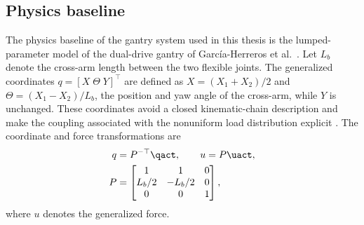 \subsection{Physics baseline}\label{sec:baseline}
The physics baseline of the gantry system used in this thesis
is the lumped-parameter model of the
dual-drive gantry of Garc\'ia-Herreros et al.~\cite{garcia2013model}.
Let \(L_b\) denote the cross-arm length between the two flexible joints.
The generalized coordinates  $q=[X\;\Theta\;Y]^\top$ are defined as $X=(X_1+X_2)/2$ and $\Theta=(X_1-X_2)/L_b$, the position and yaw angle of the cross-arm, while $Y$ is
unchanged. These coordinates avoid
a closed kinematic-chain description and make the coupling 
associated with the
nonuniform load distribution explicit \cite{garcia2013model}.
The coordinate and force transformations are
\begin{equation}
\begin{aligned}
  q &= P^{-\top}\qact,
  \qquad
  u = P\uact,\\
  P &=
  \begin{bmatrix}
    1 & 1 & 0\\
    L_b/2 & -L_b/2 & 0\\
    0 & 0 & 1
  \end{bmatrix},
\end{aligned}
\label{eq:Ptransform}
\end{equation}
where $u$ denotes the generalized force.


